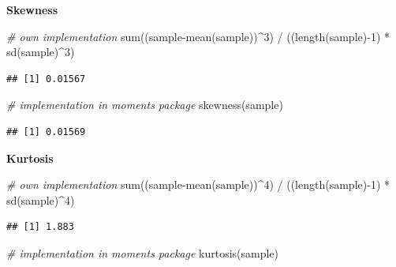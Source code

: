 \documentclass[
  12pt,
]{style/krantz}
\newenvironment{Shaded}{\begin{snugshade}}{\end{snugshade}}
\newcommand{\CommentTok}[1]{\textcolor[rgb]{0.56,0.35,0.01}{\textit{#1}}}
\newcommand{\DecValTok}[1]{\textcolor[rgb]{0.00,0.00,0.81}{#1}}
\newcommand{\FunctionTok}[1]{\textcolor[rgb]{0.00,0.00,0.00}{#1}}
\newcommand{\NormalTok}[1]{#1}
\newcommand{\SpecialCharTok}[1]{\textcolor[rgb]{0.00,0.00,0.00}{#1}}
\begin{document}
\textbf{Skewness}

\begin{Shaded}
\begin{Highlighting}[]
\CommentTok{\# own implementation}
\FunctionTok{sum}\NormalTok{((sample}\SpecialCharTok{{-}}\FunctionTok{mean}\NormalTok{(sample))}\SpecialCharTok{\^{}}\DecValTok{3}\NormalTok{) }\SpecialCharTok{/}\NormalTok{ ((}\FunctionTok{length}\NormalTok{(sample)}\SpecialCharTok{{-}}\DecValTok{1}\NormalTok{) }\SpecialCharTok{*} \FunctionTok{sd}\NormalTok{(sample)}\SpecialCharTok{\^{}}\DecValTok{3}\NormalTok{)}
\end{Highlighting}
\end{Shaded}

\begin{verbatim}
## [1] 0.01567
\end{verbatim}

\begin{Shaded}
\begin{Highlighting}[]
\CommentTok{\# implementation in moments package}
\FunctionTok{skewness}\NormalTok{(sample)}
\end{Highlighting}
\end{Shaded}

\begin{verbatim}
## [1] 0.01569
\end{verbatim}

\textbf{Kurtosis}

\begin{Shaded}
\begin{Highlighting}[]
\CommentTok{\# own implementation}
\FunctionTok{sum}\NormalTok{((sample}\SpecialCharTok{{-}}\FunctionTok{mean}\NormalTok{(sample))}\SpecialCharTok{\^{}}\DecValTok{4}\NormalTok{) }\SpecialCharTok{/}\NormalTok{ ((}\FunctionTok{length}\NormalTok{(sample)}\SpecialCharTok{{-}}\DecValTok{1}\NormalTok{) }\SpecialCharTok{*} \FunctionTok{sd}\NormalTok{(sample)}\SpecialCharTok{\^{}}\DecValTok{4}\NormalTok{)}
\end{Highlighting}
\end{Shaded}

\begin{verbatim}
## [1] 1.883
\end{verbatim}

\begin{Shaded}
\begin{Highlighting}[]
\CommentTok{\# implementation in moments package}
\FunctionTok{kurtosis}\NormalTok{(sample)}
\end{Highlighting}
\end{Shaded}
\end{document}

